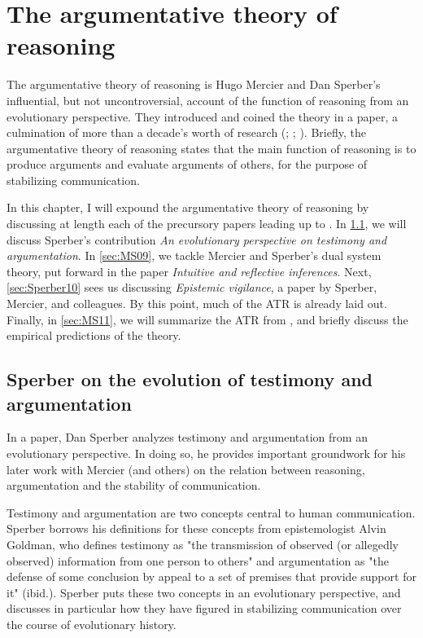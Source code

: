 \chapter{The argumentative theory of reasoning}
\label{ch:atr}

The argumentative theory of reasoning is Hugo Mercier and Dan Sperber's influential, but not uncontroversial, account of the function of reasoning from an evolutionary perspective. They introduced and coined the theory in a \citeyear{MS11} paper, a culmination of more than a decade's worth of research (\citealp{Sperber01}; \citealp{MS09}; \citealp{Sperber10}).
Briefly, the argumentative theory of reasoning states that the main function of reasoning is to produce arguments and evaluate arguments of others, for the purpose of stabilizing communication.

In this chapter, I will expound the argumentative theory of reasoning by discussing at length each of the precursory papers leading up to \citet{MS11}.
In \cref{sec:Sperber01}, we will discuss Sperber's \citeyear{Sperber01} contribution \emph{An evolutionary perspective on testimony and argumentation}. In \cref{sec:MS09}, we tackle Mercier and Sperber's dual system theory, put forward in the \citeyear{MS09} paper \emph{Intuitive and reflective inferences}.
Next, \cref{sec:Sperber10} sees us discussing \emph{Epistemic vigilance}, a \citeyear{Sperber10} paper by Sperber, Mercier, and colleagues.
By this point, much of the ATR is already laid out.
Finally, in \cref{sec:MS11}, we will summarize the ATR from \citet{MS11}, and briefly discuss the empirical predictions of the theory.

\section{Sperber on the evolution of testimony and argumentation}
\label{sec:Sperber01}

In a \citeyear{Sperber01} paper, Dan Sperber analyzes testimony and argumentation from an evolutionary perspective. In doing so, he provides important groundwork for his later work with Mercier (and others) on the relation between reasoning, argumentation and the stability of communication.

Testimony and argumentation are two concepts central to human communication. Sperber borrows his definitions for these concepts from epistemologist Alvin Goldman, who defines testimony as "the transmission of observed (or allegedly observed) information from one person to others" \citep[p.~401]{Sperber01} and argumentation as "the defense of some conclusion by appeal to a set of premises that provide support for it" (ibid.).
Sperber puts these two concepts in an evolutionary perspective, and discusses in particular how they have figured in stabilizing communication over the course of evolutionary history.

